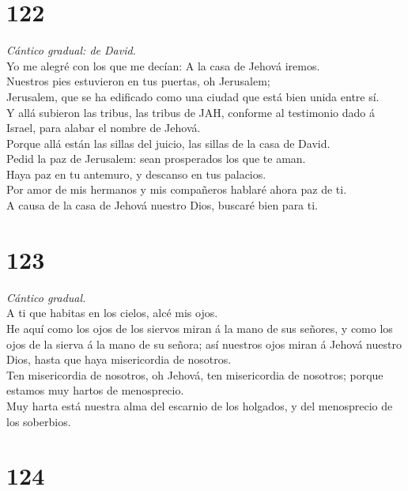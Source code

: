 \hypertarget{section-121}{%
\section{122}\label{section-121}}

 \emph{Cántico gradual: de David.}\\
Yo me alegré con los que me decían: A la casa de Jehová iremos.\\
 Nuestros pies estuvieron en tus puertas, oh Jerusalem;\\
 Jerusalem, que se ha edificado como una ciudad que está
bien unida entre sí.\\
 Y allá subieron las tribus, las tribus de JAH, conforme al
testimonio dado á Israel, para alabar el nombre de Jehová.\\
 Porque allá están las sillas del juicio, las sillas de la
casa de David.\\
 Pedid la paz de Jerusalem: sean prosperados los que te
aman.\\
 Haya paz en tu antemuro, y descanso en tus palacios.\\
 Por amor de mis hermanos y mis compañeros hablaré ahora paz
de ti.\\
 A causa de la casa de Jehová nuestro Dios, buscaré bien
para ti.

\hypertarget{section-122}{%
\section{123}\label{section-122}}

 \emph{Cántico gradual.}\\
A ti que habitas en los cielos, alcé mis ojos.\\
 He aquí como los ojos de los siervos miran á la mano de sus
señores, y como los ojos de la sierva á la mano de su señora; así
nuestros ojos miran á Jehová nuestro Dios, hasta que haya misericordia
de nosotros.\\
 Ten misericordia de nosotros, oh Jehová, ten misericordia
de nosotros; porque estamos muy hartos de menosprecio.\\
 Muy harta está nuestra alma del escarnio de los holgados, y
del menosprecio de los soberbios.

\hypertarget{section-123}{%
\section{124}\label{section-123}}

